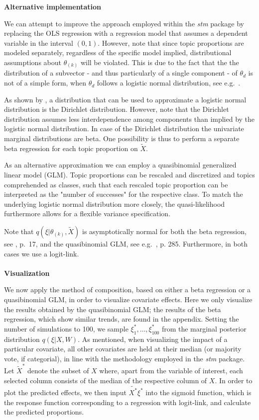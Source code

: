 \noindent \textbf{Alternative implementation} \vspace{10px}

\noindent We can attempt to improve the approach employed within the \textit{stm} package by replacing the OLS regression with a regression model that assumes a dependent variable in the interval $(0,1)$. However, note that since topic proportions are modeled separately, regardless of the specific model implied, distributional assumptions about $\theta_{(k)}$ will be violated. This is due to the fact that the the distribution of a subvector - and thus particularly of a single component - of $\theta_d$ is not of a simple form, when $\theta_d$ follows a logistic normal distribution, see e.g.\ \cite{atchison1980logistic}.

As shown by \cite{atchison1980logistic}, a distribution that can be used to approximate a logistic normal distribution is the Dirichlet distribution. However, note that the Dirichlet distribution assumes less interdependence among components than implied by the logistic normal distribution. In case of the Dirichlet distribution the univariate marginal distributions are beta. One possibility is thus to perform a separate beta regression for each topic proportion on $\tilde{X}$. 

As an alternative approximation we can employ a quasibinomial generalized linear model (GLM). Topic proportions can be rescaled and discretized and topics comprehended as classes, such that each rescaled topic proportion can be interpreted as the "number of successes" for the respective class. To match the underlying logistic normal distribution more closely, the quasi-likelihood furthermore allows for a flexible variance specification.

Note that $q(\xi| \theta_{(k)}, \tilde{X})$ is asymptotically normal for both the beta regression, see \cite{ferrari2004beta}, p.\ 17, and the quasibinomial GLM, see e.g.\ \cite{fahrmeir2007regression}, p. 285. Furthermore, in both cases we use a logit-link. \\
\\
\noindent \textbf{Visualization} \vspace{10px}

\noindent We now apply the method of composition, based on either a beta regression or a quasibinomial GLM, in order to visualize covariate effects. Here we only visualize the results obtained by the quasibinomial GLM; the results of the beta regression, which show similar trends, are found in the appendix. Setting the number of simulations to 100, we sample $\xi^*_1, \dots, \xi^*_{100}$ from the  marginal posterior distribution $q(\xi | X, W)$. As mentioned, when visualizing the impact of a particular covariate, all other covariates are held at their median (or majority vote, if categorial), in line with the methodology employed in the \textit{stm} package.
Let $\tilde{X}^*$ denote the subset of $X$ where, apart from the variable of interest, each selected column consists of the median of the respective column of $X$. In order to plot the predicted effects, we then input $\tilde{X^*}\xi^*$ into the sigmoid function, which is the response function corresponding to a regression with logit-link, and calculate the predicted proportions. 

